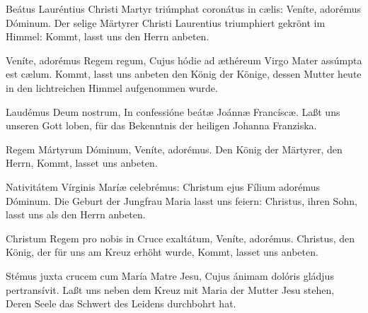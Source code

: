 \documentclass[fontsize=9pt,paper=A6,twoside,BCOR=1mm,DIV=22,headinclude]{scrarticle}
\begin{document}
\begin{paracol}{2}\pcb
	Beátus Lauréntius Christi Martyr triúmphat coronátus in cælis: \red{*} Veníte, adorémus Dóminum.
	\switchcolumn 
	Der selige Märtyrer Christi Laurentius triumphiert gekrönt im Himmel: \red{*} Kommt, lasst uns den Herrn anbeten.
\end{paracol}

\begin{paracol}{2}\pcb
	Veníte, adorémus Regem regum, \red{*} Cujus hódie ad æthéreum Virgo Mater assúmpta est cælum.
	\switchcolumn 
	Kommt, lasst uns anbeten den König der Könige, \red{*} dessen Mutter heute in den lichtreichen Himmel aufgenommen wurde.
\end{paracol}

\begin{paracol}{2}\pcb
	Laudémus Deum nostrum, \red{*} In confessióne beátæ Joánnæ Francíscæ.
	\switchcolumn 
	Laßt uns unseren Gott loben, \red{*} für das Bekenntnis der heiligen Johanna Franziska.
\end{paracol}

\begin{paracol}{2}\pcb
	Regem Mártyrum Dóminum, \red{*} Veníte, adorémus.
	\switchcolumn 
	Den König der Märtyrer, den Herrn, \red{*} Kommt, lasset uns anbeten.
\end{paracol}

\begin{paracol}{2}\pcb
	Nativitátem Vírginis Maríæ celebrémus: \red{*} Christum ejus Fílium adorémus Dóminum.
	\switchcolumn 
	Die Geburt der Jungfrau Maria lasst uns feiern: \red{*} Christus, ihren Sohn, lasst uns als den Herrn anbeten.
\end{paracol}

\pagebreak
{}
\begin{paracol}{2}\pcb
	Christum Regem pro nobis in Cruce exaltátum, \red{*} Veníte, adorémus.
	\switchcolumn 
	Christus, den König, der für uns am Kreuz erhöht wurde, \red{*} Kommt, lasset uns anbeten.
\end{paracol}

\begin{paracol}{2}\pcb
	Stémus juxta crucem cum María Matre Jesu, \red{*} Cujus ánimam dolóris gládjus pertransívit.
	\switchcolumn 
	Laßt uns neben dem Kreuz mit Maria der Mutter Jesu stehen, \red{*} Deren Seele das Schwert des Leidens durchbohrt hat.
\end{paracol}
\end{document}
